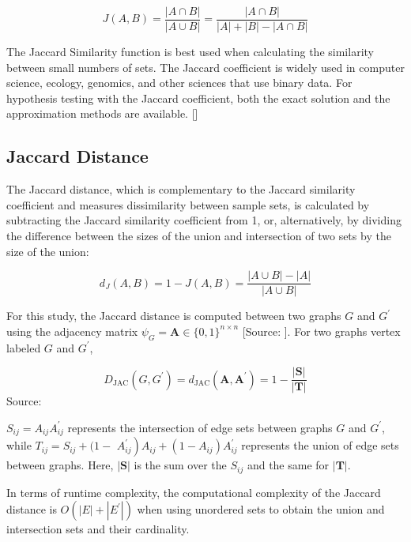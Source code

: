 \begin{equation}
J(A, B)=\frac{|A \cap B|}{|A \cup B|}=\frac{|A \cap B|}{|A|+|B|-|A \cap B|}
\end{equation}

The Jaccard Similarity function is best used when calculating the similarity between small numbers of sets. The Jaccard coefficient is widely used in computer science, ecology, genomics, and other sciences that use binary data.  For hypothesis testing with the Jaccard coefficient, both the exact solution and the approximation methods are available. [\cite{Chung:2019}]


\subsection{Jaccard Distance}
The Jaccard distance, which is complementary to the Jaccard similarity coefficient and measures dissimilarity between sample sets, is calculated by subtracting the Jaccard similarity coefficient from 1, or, alternatively, by dividing the difference between the sizes of the union and intersection of two sets by the size of the union:

\begin{equation}
d_{J}(A, B)=1-J(A, B)=\frac{|A \cup B|-|A|}{|A \cup B|}
\end{equation}

For this study, the Jaccard distance is computed between two graphs $G$ and $G^{\prime}$ using the adjacency matrix $\psi_{G}=\mathbf{A} \in\{0,1\}^{n \times n}$ [Source: \cite{McCabe:2019}]. For two graphs vertex labeled $G$ and $G^{\prime}$,

\begin{equation}
D_{\mathrm{JAC}}\left(G, G^{\prime}\right)=d_{\mathrm{JAC}}\left(\mathbf{A}, \mathbf{A}^{\prime}\right)=1-\frac{|\mathbf{S}|}{|\mathbf{T}|}
\end{equation}
{Source:\cite{McCabe:2019}}

$S_{i j}=A_{i j} A_{i j}^{\prime}$ represents the intersection of edge sets between graphs $G$ and $G^{\prime}$, while $T_{i j}=S_{i j}+(1-$ $\left.A_{i j}^{\prime}\right) A_{i j}+\left(1-A_{i j}\right) A_{i j}^{\prime}$ represents the union of edge sets between graphs. Here, $|\mathbf{S}|$ is the sum over the $S_{i j}$ and the same for $|\mathbf{T}|$. 

In terms of runtime complexity, the computational complexity of the Jaccard distance is $O\left(|E|+\left|E^{\prime}\right|\right)$ when using unordered sets to obtain the union and intersection sets and their cardinality.

